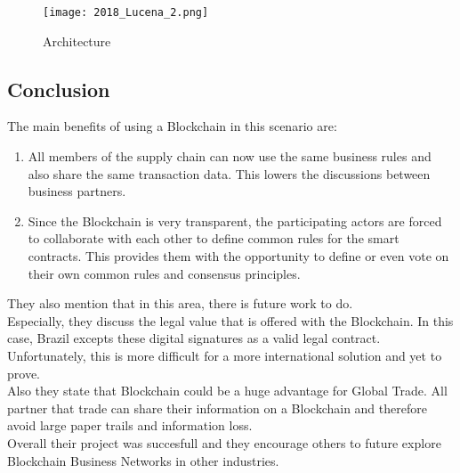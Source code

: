 \begin{figure}[!ht]
    \centering
    \label{fig:2018_Lucena_Implementation_Architecture}
    \caption{Architecture}
    \texttt{[image: 2018\_Lucena\_2.png]}
\end{figure}

\subsection*{Conclusion}
The main benefits of using a Blockchain in this scenario are:
\begin{enumerate}[label={\arabic*)},font={\color{red!50!black}\bfseries},noitemsep]
	\item All members of the supply chain can now use the same business rules and also share the same transaction data. This lowers the discussions between business partners.
	\item Since the Blockchain is very transparent, the participating actors are forced to collaborate with each other to define common rules for the smart contracts. This provides them with the opportunity to define or even vote on their own common rules and consensus principles.
\end{enumerate}
They also mention that in this area, there is future work to do.\\
Especially, they discuss the legal value that is offered with the Blockchain. In this case, Brazil excepts these digital signatures as a valid legal contract. Unfortunately, this is more difficult for a more international solution and yet to prove.\\
Also they state that Blockchain could be a huge advantage for Global Trade. All partner that trade can share their information on a Blockchain and therefore avoid large paper trails and information loss.\\
Overall their project was succesfull and they encourage others to future explore Blockchain Business Networks in other industries.